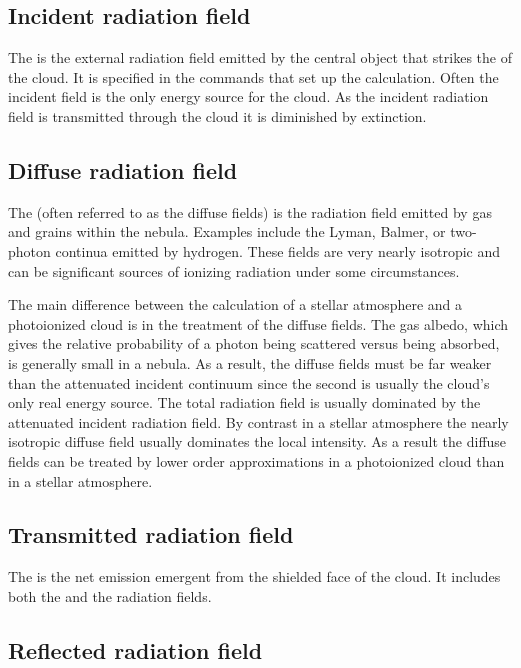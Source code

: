 \subsection{Incident radiation field}

The  is the external radiation field emitted by the central
object that strikes the  of the cloud.
It is specified in
the commands that set up the calculation.
Often the incident field
is the only energy source for the cloud.
As the incident radiation field is
transmitted through the cloud it is diminished by extinction.

\subsection{Diffuse radiation field }

The  (often referred to as the
diffuse fields) is the radiation field emitted by gas and grains within
the nebula.  Examples include the Lyman, Balmer, or two-photon continua
emitted by hydrogen.  These fields are very nearly isotropic and can be
significant sources of ionizing radiation under some circumstances.

The main difference between the calculation of a stellar atmosphere and
a photoionized cloud is in the treatment of the diffuse fields.
The gas
albedo, which gives the relative probability of a photon being scattered
versus being absorbed, is generally small in a nebula.
As a result, the
diffuse fields must be far weaker than the attenuated incident continuum
since the second is usually the cloud's only real energy source.
The total radiation field is usually dominated by the attenuated
incident radiation field.
By contrast
in a stellar atmosphere the nearly isotropic diffuse field usually dominates
the local intensity.
As a result the diffuse fields can be treated by lower
order approximations in a photoionized cloud than in a stellar atmosphere.

\subsection{Transmitted radiation field}

The  is the net
emission emergent from the shielded
face of the cloud.
It includes both the  and
the  radiation fields.

\subsection{Reflected radiation field}

